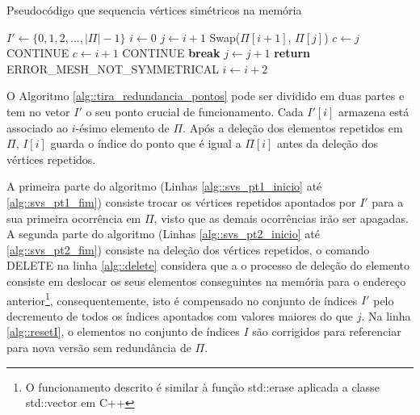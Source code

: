  \begin{algorithm}
 \caption{Pseudocódigo que sequencia vértices simétricos na memória}
 \label{alg::reordena_simetricos}
 \begin{algorithmic}[1]
 \State $I' \gets \{0, 1, 2, ..., |\Pi| - 1\}$
 \State $i \gets 0$
     \State $j \gets i + 1$
         \If {$\Pi[i] = -\Pi[j]$}
             \State Swap($\Pi[i+1]$, $\Pi[j]$) \label{alg::troca}
              \label{alg::compensacao_inicio}
                    \State $c \gets j$
                    \State CONTINUE
                    \State $c \gets i+1$
                    \State CONTINUE
                \EndIf
             \EndFor
             \State \textbf{break}
         \EndIf 
         \State $j \gets j + 1$
            \State \textbf{return} ERROR\_MESH\_NOT\_SYMMETRICAL
         \EndIf
     \EndWhile \label{alg::compensacao_fim}
     \State $i \gets i + 2$
\EndWhile
 \EndProcedure
 \end{algorithmic}
 \end{algorithm}
 
 O Algoritmo \ref{alg::tira_redundancia_pontos} pode ser dividido em duas partes e tem no vetor $I'$ o seu ponto crucial de funcionamento. Cada $I'[i]$ armazena está associado ao $i$-ésimo elemento de $\Pi$. Após a deleção dos elementos repetidos em $\Pi$, $I[i]$ guarda o índice do ponto que é igual a $\Pi[i]$ antes da deleção dos vértices repetidos.
 
 A primeira parte do algoritmo (Linhas \ref{alg::svs_pt1_inicio} até \ref{alg::svs_pt1_fim}) consiste trocar os vértices repetidos apontados por $I'$ para a sua primeira ocorrência em $\Pi$, visto que as demais ocorrências irão ser apagadas. A segunda parte do algoritmo (Linhas \ref{alg::svs_pt2_inicio} até \ref{alg::svs_pt2_fim}) consiste na deleção dos vértices repetidos, o comando DELETE na linha \ref{alg::delete} considera que a o processo de deleção do elemento consiste em deslocar os seus elementos conseguintes na memória para o endereço anterior\footnote{O funcionamento descrito é similar à função std::erase aplicada a classe std::vector em C++}, consequentemente, isto é compensado no conjunto de índices $I'$ pelo decremento de todos os índices apontados com valores maiores do que $j$. Na linha \ref{alg::resetI}, o elementos no conjunto de índices $I$ são corrigidos para referenciar para nova versão sem redundância de $\Pi$.
 
